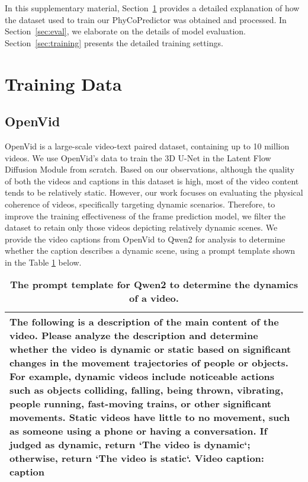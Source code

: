 

\clearpage
\setcounter{page}{1}
\maketitlesupplementary

\appendix




In this supplementary material, Section~\ref{sec:data} provides a detailed explanation of how the dataset used to train our PhyCoPredictor was obtained and processed. In Section~\ref{sec:eval}, we elaborate on the details of model evaluation. Section~\ref{sec:training} presents the detailed training settings.

\section{Training Data}
\label{sec:data}

\subsection{OpenVid}

OpenVid \cite{openvid} is a large-scale video-text paired dataset, containing up to 10 million videos. We use OpenVid's data to train the 3D U-Net in the Latent Flow Diffusion Module from scratch. Based on our observations, although the quality of both the videos and captions in this dataset is high, most of the video content tends to be relatively static. However, our work focuses on evaluating the physical coherence of videos, specifically targeting dynamic scenarios. Therefore, to improve the training effectiveness of the frame prediction model, we filter the dataset to retain only those videos depicting relatively dynamic scenes. We provide the video captions from OpenVid to Qwen2 \cite{qwen2} for analysis to determine whether the caption describes a dynamic scene, using a prompt template shown in the Table \ref{tab:template_qwen} below.

\begin{table}[ht]
\centering
\setlength{\tabcolsep}{0pt}  %
\fontsize{8}{10}\selectfont
\renewcommand{\arraystretch}{1.0}
\begin{tabularx}{\columnwidth}{@{}X@{}}  %
\toprule
\rowcolor{mycolor}
\sloppy
The following is a description of the main content of the video. Please analyze the description and determine whether the video is dynamic or static based on significant changes in the movement trajectories of people or objects. For example, dynamic videos include noticeable actions such as objects colliding, falling, being thrown, vibrating, people running, fast-moving trains, or other significant movements. Static videos have little to no movement, such as someone using a phone or having a conversation. If judged as dynamic, return `The video is dynamic`; otherwise, return `The video is static`. Video caption: \textbf{caption} \\
\bottomrule
\end{tabularx}
\caption{\textbf{The prompt template for Qwen2 to determine the dynamics of a video.}}
\label{tab:template_qwen}
\end{table}



